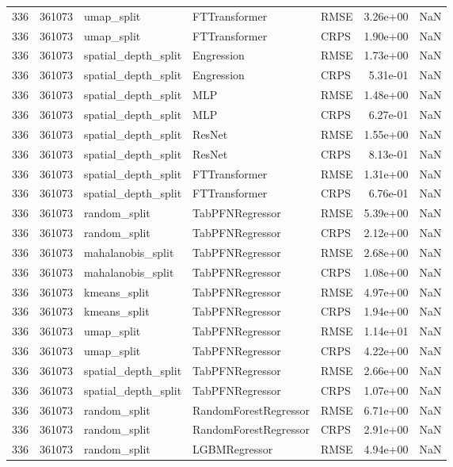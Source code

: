 \begin{tabular}{rrlllrr}
336 & 361073 & umap\_split & FTTransformer & RMSE & 3.26e+00 & NaN \\
336 & 361073 & umap\_split & FTTransformer & CRPS & 1.90e+00 & NaN \\
336 & 361073 & spatial\_depth\_split & Engression & RMSE & 1.73e+00 & NaN \\
336 & 361073 & spatial\_depth\_split & Engression & CRPS & 5.31e-01 & NaN \\
336 & 361073 & spatial\_depth\_split & MLP & RMSE & 1.48e+00 & NaN \\
336 & 361073 & spatial\_depth\_split & MLP & CRPS & 6.27e-01 & NaN \\
336 & 361073 & spatial\_depth\_split & ResNet & RMSE & 1.55e+00 & NaN \\
336 & 361073 & spatial\_depth\_split & ResNet & CRPS & 8.13e-01 & NaN \\
336 & 361073 & spatial\_depth\_split & FTTransformer & RMSE & 1.31e+00 & NaN \\
336 & 361073 & spatial\_depth\_split & FTTransformer & CRPS & 6.76e-01 & NaN \\
336 & 361073 & random\_split & TabPFNRegressor & RMSE & 5.39e+00 & NaN \\
336 & 361073 & random\_split & TabPFNRegressor & CRPS & 2.12e+00 & NaN \\
336 & 361073 & mahalanobis\_split & TabPFNRegressor & RMSE & 2.68e+00 & NaN \\
336 & 361073 & mahalanobis\_split & TabPFNRegressor & CRPS & 1.08e+00 & NaN \\
336 & 361073 & kmeans\_split & TabPFNRegressor & RMSE & 4.97e+00 & NaN \\
336 & 361073 & kmeans\_split & TabPFNRegressor & CRPS & 1.94e+00 & NaN \\
336 & 361073 & umap\_split & TabPFNRegressor & RMSE & 1.14e+01 & NaN \\
336 & 361073 & umap\_split & TabPFNRegressor & CRPS & 4.22e+00 & NaN \\
336 & 361073 & spatial\_depth\_split & TabPFNRegressor & RMSE & 2.66e+00 & NaN \\
336 & 361073 & spatial\_depth\_split & TabPFNRegressor & CRPS & 1.07e+00 & NaN \\
336 & 361073 & random\_split & RandomForestRegressor & RMSE & 6.71e+00 & NaN \\
336 & 361073 & random\_split & RandomForestRegressor & CRPS & 2.91e+00 & NaN \\
336 & 361073 & random\_split & LGBMRegressor & RMSE & 4.94e+00 & NaN \\

\end{tabular}
